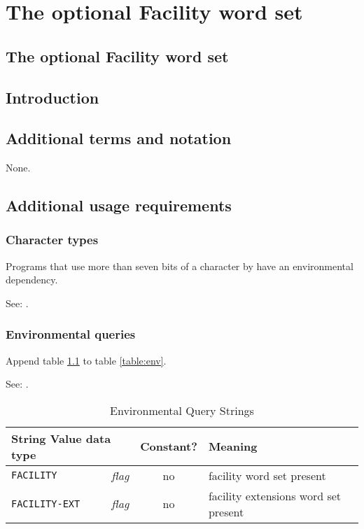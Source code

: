 \chapter{The optional Facility word set} %

\begin{intro}
\section{The optional Facility word set}
\end{intro}

\section{Introduction} %

\section{Additional terms and notation} %
None.

\section{Additional usage requirements} %

\subsection{Character types} %
Programs that use more than seven bits of a character by
 have an environmental dependency.

See: .

\subsection{Environmental queries} %
Append table \ref{facility:env} to table \ref{table:env}.

See: .

\begin{table}[h]
  \begin{center}
	\caption{Environmental Query Strings}
	\label{facility:env}
	\begin{tabular}{p{9em}rcp{}}
		\hline\hline
		\multicolumn{2}{l}{String \hfill Value data type} & Constant? & Meaning \\
		\hline
		\texttt{FACILITY}		& \emph{flag}	& no	&
			facility word set present \\
		\texttt{FACILITY-EXT}	& \emph{flag}	& no	&
			facility extensions word set present \\
		\hline\hline
	\end{tabular}
  \end{center}
\end{table}

